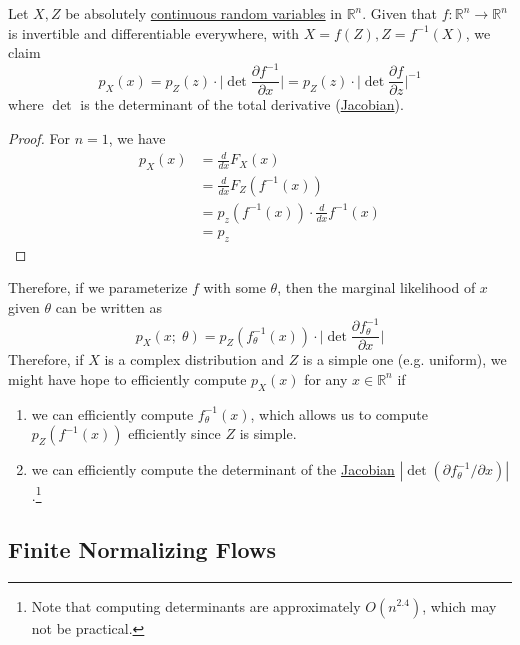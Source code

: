 \documentclass{article}
\begin{document}
  \begin{lemma}[Jacobi]
    \label{thm:jacobi}
 
    Let $X, Z$ be absolutely \hyperref[prob-def:continuous-random-variable]{continuous random variables} in $\mathbb{R}^n$. 
    Given that $f: \mathbb{R}^n \rightarrow \mathbb{R}^n$ is invertible and differentiable everywhere, with $X = f(Z), Z = f^{-1} (X)$, we claim 
    \begin{equation}
      p_X (x) = p_Z (z) \cdot \bigg| \det \frac{\partial f^{-1}}{\partial x} \bigg| = p_Z (z) \cdot \bigg| \det \frac{\partial f}{\partial z}  \bigg|^{-1}
    \end{equation} 
    where $\det$ is the determinant of the total derivative (\hyperref[mv-def:jacobian]{Jacobian}). 
  \end{lemma}
  \begin{proof}
    For $n = 1$, we have 
    \begin{align}
      p_X (x) & = \frac{d}{dx} F_X (x) \\
              & = \frac{d}{dx} F_Z (f^{-1}(x)) \\
              & = p_z (f^{-1} (x)) \cdot \frac{d}{dx} f^{-1} (x)  \\
              & = p_z 
    \end{align}
  \end{proof} 

  Therefore, if we parameterize $f$ with some $\theta$, then the marginal likelihood of $x$ given $\theta$ can be written as 
  \begin{equation}
    p_X (x;\; \theta) = p_Z (f^{-1}_\theta (x)) \cdot \bigg| \det \frac{\partial f_\theta^{-1}}{\partial x} \bigg|
  \end{equation} 
  Therefore, if $X$ is a complex distribution and $Z$ is a simple one (e.g. uniform), we might have hope to efficiently compute $p_X (x)$ for any $x \in \mathbb{R}^n$ if 
  \begin{enumerate}
    \item we can efficiently compute $f^{-1}_\theta (x)$, which allows us to compute $p_Z (f^{-1} (x))$ efficiently since $Z$ is simple. 
    \item we can efficiently compute the determinant of the \hyperref[mv-def:jacobian]{Jacobian} $|\det (\partial f_\theta^{-1}/\partial x)|$.\footnote{Note that computing determinants are approximately $O(n^{2.4})$, which may not be practical. } 
  \end{enumerate}  

\subsection{Finite Normalizing Flows}
\end{document}
